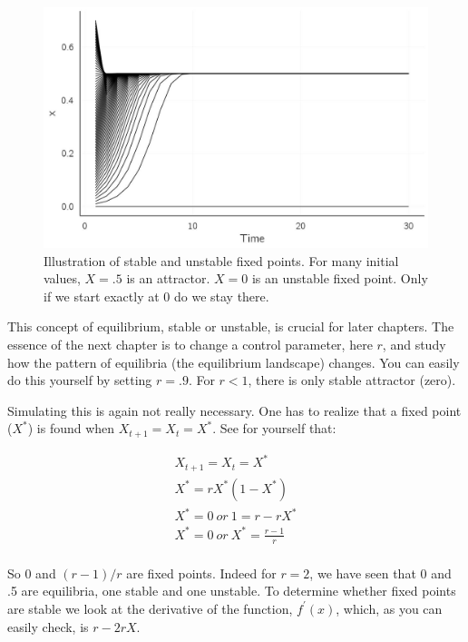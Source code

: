 \documentclass[
  a4paper,
  DIV=11,
  numbers=noendperiod,
  oneside]{scrreprt}
\begin{document}
\begin{figure}

{\centering \includegraphics{media/ch2/fig-ch2-img3.jpg}

}

\caption{\label{fig-ch2-img3}Illustration of stable and unstable fixed
points. For many initial values, \(X = .5\) is an attractor. \(X = 0\)
is an unstable fixed point. Only if we start exactly at 0 do we stay
there.}

\end{figure}

This concept of equilibrium, stable or unstable, is crucial for later
chapters. The essence of the next chapter is to change a control
parameter, here \(r\), and study how the pattern of equilibria (the
equilibrium landscape) changes. You can easily do this yourself by
setting \(r = .9\). For \(r < 1\), there is only stable attractor
(zero).

Simulating this is again not really necessary. One has to realize that a
fixed point (\(X^{*}\)) is found when \(X_{t + 1} = X_{t} = X^{*}\). See
for yourself that:

\[
\begin{gathered}
X_{t + 1} = X_{t} = X^{*} \\
X^{*} = rX^{*}( 1 - X^{*}) \\
X^{*} = 0\ or\ 1 = r - rX^{*} \\
X^{*} = 0\ or\ X^{*} = \frac{r - 1}{r} \\
\end{gathered}
\]

So 0 and \((r - 1)/r\) are fixed points. Indeed for \(r = 2\), we have
seen that 0 and .5 are equilibria, one stable and one unstable. To
determine whether fixed points are stable we look at the derivative of
the function, \(f^{'}(x)\), which, as you can easily check, is
\(r - 2rX\).
\end{document}
